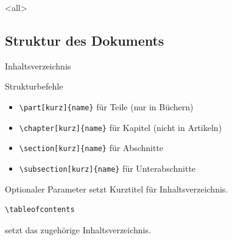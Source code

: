 \mode
<all>

\jonny


\subsection{Struktur des Dokuments}

\begin{Frame}[fragile]{Inhaltsverzeichnis}
  \begin{Block}{Strukturbefehle}
    \begin{itemize}
      \item \lstinline-\part[kurz]{name}- für Teile (nur in Büchern)
      \item \lstinline-\chapter[kurz]{name}- für Kapitel (nicht in Artikeln)
      \item \lstinline-\section[kurz]{name}- für Abschnitte
      \item \lstinline-\subsection[kurz]{name}- für Unterabschnitte
    \end{itemize}
  \end{Block}
  Optionaler Parameter setzt Kurztitel für Inhaltsverzeichnis.

  \xxx

  \begin{lstlisting}[gobble=4]
    \tableofcontents
  \end{lstlisting}
  setzt das zugehörige Inhaltsverzeichnis.
\end{Frame}

